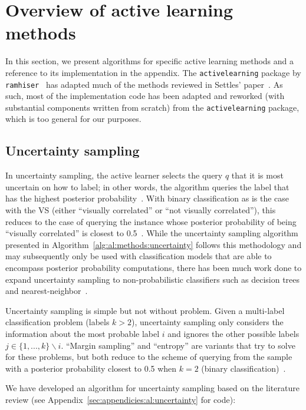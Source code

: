\section{Overview of active learning methods}
\label{sec:al:methods}

In this section, we present algorithms for specific active learning methods and 
a reference to its implementation in the appendix. The 
\texttt{activelearning} package by \texttt{ramhiser}~\cite{ramhiser2015} has 
adapted much of the methods reviewed in Settles' paper~\cite{settles2010}. As 
such, most of the implementation code has been adapted and reworked (with 
substantial components written from scratch) from the 
\texttt{activelearning} package, which is too general for our purposes.

\subsection{Uncertainty sampling}
\label{sec:al:methods:uncertainty} 

In uncertainty sampling, the active learner selects the query $q$ that it is 
most uncertain on how to label; in other words, the algorithm queries the label 
that has the highest posterior probability~\cite{lewis1994}. With binary 
classification as is the case with the VS (either ``visually correlated'' or 
``not visually correlated''), this reduces to the case of querying the instance 
whose posterior probability of being ``visually correlated'' is closest to 
0.5~\cite{lewis1994}. While the uncertainty sampling algorithm presented in 
Algorithm~\ref{alg:al:methods:uncertainty} follows this 
methodology and may subsequently only be used with classification models that 
are able to encompass posterior probability computations, there has been much 
work done to expand uncertainty sampling to non-probabilistic classifiers such 
as decision trees and nearest-neighbor~\cite{settles2010}.

Uncertainty sampling is simple but not without problem. Given a multi-label 
classification problem (labels $k > 2$), uncertainty sampling only 
considers the information about the most probable label $i$ and ignores the 
other possible labels $j \in \{1,...,k\}\backslash i$. ``Margin sampling'' and 
``entropy'' are variants that try to solve for these problems, but 
both reduce to the scheme of querying from the sample with a posterior 
probability closest to 0.5 when $k=2$ (binary 
classification)~\cite{settles2010}.

We have developed an algorithm for uncertainty sampling based on the literature 
review (see Appendix~\ref{sec:appendicies:al:uncertainty} for code):

